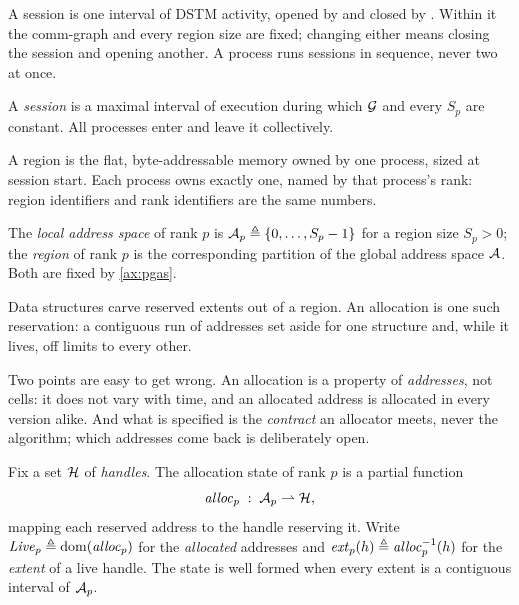 A session is one interval of DSTM activity, opened by  and
closed by . Within it the \gls{comm-graph} and every region
size are fixed; changing either means closing the session and opening
another. A process runs sessions in sequence, never two at once.

\begin{definition}[Session]\label{def:session}
A \emph{session} is a maximal interval of execution during which $\mathcal{G}$ and
every $S_p$ are constant. All processes enter and leave it collectively.
\end{definition}

A region is the flat, byte-addressable memory owned by one process, sized at
session start. Each process owns exactly one, named by that process's rank:
region identifiers and rank identifiers are the same numbers.

\begin{definition}\label{def:region}
The \emph{local address space} of rank $p$ is
$\mathcal{A}_{p} \triangleq \{0, \dots, S_p - 1\}$ for a region size $S_p > 0$; the
\emph{region} of rank $p$ is the corresponding partition of the global address
space $\mathcal{A}$. Both are fixed by \cref{ax:pgas}.
\end{definition}

Data structures carve reserved extents out of a region. An allocation is one
such reservation: a contiguous run of addresses set aside for one structure
and, while it lives, off limits to every other.

Two points are easy to get wrong. An allocation is a property of
\emph{addresses}, not \glspl{cell}: it does not vary with time, and an
allocated address is allocated in every \gls{version} alike. And what is
specified is the \emph{contract} an allocator meets, never the algorithm;
which addresses come back is deliberately open.

\begin{definition}[Allocation]\label{def:allocation}
Fix a set $\mathcal{H}$ of \emph{handles}. The allocation state of rank $p$ is a
partial function
\[
  \mathit{alloc}_{p} \;:\; \mathcal{A}_{p} \rightharpoonup \mathcal{H} ,
\]
mapping each reserved address to the handle reserving it. Write
$\mathit{Live}_{p} \triangleq \operatorname{dom}(\mathit{alloc}_{p})$ for the \emph{allocated}
addresses and $\mathit{ext}_{p}(h) \triangleq \mathit{alloc}_{p}^{-1}(h)$ for the \emph{extent}
of a live handle. The state is well formed when every extent is a contiguous
interval of $\mathcal{A}_{p}$.
\end{definition}

